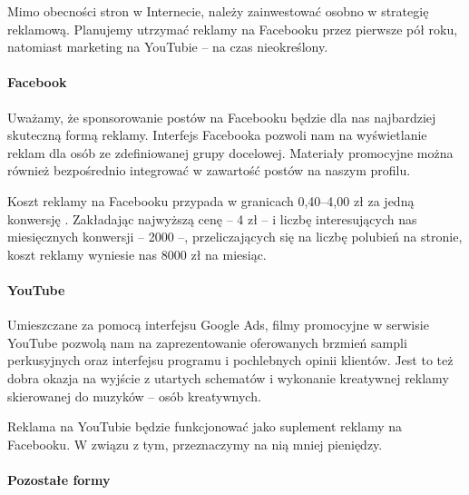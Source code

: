 \documentclass[12pt]{article}
\begin{document}
Mimo obecności stron w Internecie, należy zainwestować osobno w strategię reklamową.
Planujemy utrzymać reklamy na Facebooku przez pierwsze pół roku, natomiast marketing na YouTubie -- na czas nieokreślony.

\paragraph{Facebook}

Uważamy, że sponsorowanie postów na Facebooku będzie dla nas najbardziej skuteczną formą reklamy.
Interfejs Facebooka pozwoli nam na wyświetlanie reklam dla osób ze zdefiniowanej grupy docelowej.
Materiały promocyjne można również bezpośrednio integrować w zawartość postów na naszym profilu.

Koszt reklamy na Facebooku przypada w granicach 0,40--4,00 zł za jedną konwersję \cite{facebook}.
Zakładając najwyższą cenę -- 4 zł -- i liczbę interesujących nas miesięcznych konwersji -- 2000 --, przeliczających się na liczbę polubień na stronie, koszt reklamy wyniesie nas 8000 zł na miesiąc.

\paragraph{YouTube}

Umieszczane za pomocą interfejsu Google Ads, filmy promocyjne w serwisie YouTube pozwolą nam na zaprezentowanie oferowanych brzmień sampli perkusyjnych oraz interfejsu programu i pochlebnych opinii klientów.
Jest to też dobra okazja na wyjście z utartych schematów i wykonanie kreatywnej reklamy skierowanej do muzyków -- osób kreatywnych.

Reklama na YouTubie będzie funkcjonować jako suplement reklamy na Facebooku.
W związu z tym, przeznaczymy na nią mniej pieniędzy.



\paragraph{Pozostałe formy}
\end{document}
